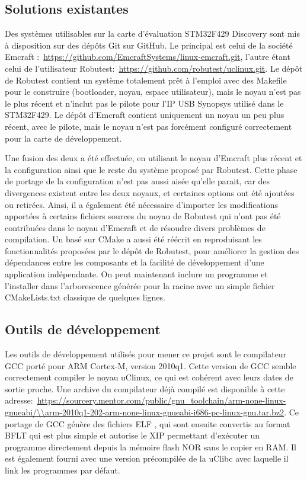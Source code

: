 \subsection{Solutions existantes}
Des systèmes utilisables sur la carte d'évaluation STM32F429 Discovery sont mis à disposition sur des dépôts Git sur GitHub.
Le principal est celui de la société Emcraft \autocite{Emcraft}:~\url{https://github.com/EmcraftSystems/linux-emcraft.git}, l'autre étant celui de l'utilisateur Robutest:~\url{https://github.com/robutest/uclinux.git}.
Le dépôt de Robutest contient un système totalement prêt à l'emploi avec des Makefile pour le construire (bootloader, noyau, espace utilisateur), mais le noyau n'est pas le plus récent et n'inclut pas le pilote pour l'\gls{IP} USB Synopsys utilisé dans le STM32F429.
Le dépôt d'Emcraft contient uniquement un noyau un peu plus récent, avec le pilote, mais le noyau n'est pas forcément configuré correctement pour la carte de développement.
        
Une fusion des deux a été effectuée, en utilisant le noyau d'Emcraft plus récent et la configuration ainsi que le reste du système proposé par Robutest.
Cette phase de portage de la configuration n'est pas aussi aisée qu'elle parait, car des divergences existent entre les deux noyaux, et certaines options ont été ajoutées ou retirées.
Ainsi, il a également été nécessaire d'importer les modifications apportées à certains fichiers sources du noyau de Robutest qui n'ont pas été contribuées dans le noyau d'Emcraft et de résoudre divers problèmes de compilation.
Un  basé sur CMake a aussi été réécrit en reproduisant les fonctionnalités proposées par le dépôt de Robutest, pour améliorer la gestion des dépendances entre les composants et la facilité de développement d'une application indépendante.
On peut maintenant inclure un programme et l'installer dans l'arborescence générée pour la racine avec un simple fichier CMakeLists.txt classique de quelques lignes.

\subsection{Outils de développement}
Les outils de développement utilisés pour mener ce projet sont le compilateur GCC porté pour ARM Cortex-M, version 2010q1.
Cette version de GCC semble correctement compiler le noyau uClinux, ce qui est cohérent avec leurs dates de sortie proche.
Une archive du compilateur déjà compilé est disponible à cette adresse:~\url{https://sourcery.mentor.com/public/gnu_toolchain/arm-none-linux-gnueabi/\\arm-2010q1-202-arm-none-linux-gnueabi-i686-pc-linux-gnu.tar.bz2}.
Ce portage de GCC génère des fichiers ELF \autocite{ELF}, qui sont ensuite convertis au format BFLT \autocite{BFLT} qui est plus simple et autorise le \gls{XIP} permettant d'exécuter un programme directement depuis la mémoire flash NOR sans le copier en RAM.
Il est également fourni avec une version précompilée de la uClibc \autocite{uClibc} avec laquelle il link les programmes par défaut.
        
